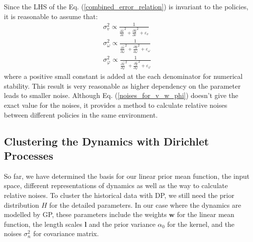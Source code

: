 \documentclass[journal]{IEEEtran}
\begin{document}
Since the LHS of the Eq. (\ref{combined_error_relation}) is invariant to the policies, it is reasonable to assume that:
\begin{equation}
\begin{gathered}
\sigma_v^2 \propto
\frac{1}{
\frac{\partial \hat{x}}{\partial v}^2 
+ \frac{\partial \hat{y}}{\partial v}^2 + \varepsilon_v}
\\
\sigma_{\omega}^2 \propto
\frac{1}{
\frac{\partial \hat{x}}{\partial \omega}^2
+
\frac{\partial \hat{y}}{\partial \omega}^2 + \varepsilon_{\omega}} 
\\
\sigma_{\varphi}^2 \propto
\frac{1}{
\frac{\partial \hat{x}}{\partial \varphi}^2
+ 
\frac{\partial \hat{y}}{\partial \varphi}^2 + \varepsilon_{\varphi}} 
\end{gathered}
\label{noises_for_v_w_phi}
\end{equation}
where a positive small constant is added at the each denominator for numerical stability.
This result is very reasonable as higher dependency on the parameter leads to smaller noise.
Although Eq. (\ref{noises_for_v_w_phi}) doesn't give the exact value for the noises, it provides a method to calculate relative noises between different policies in the same environment.



\subsection{Clustering the Dynamics with Dirichlet Processes}
So far, we have determined the basis for our linear prior mean function, the input space, different representations of dynamics as well as the way to calculate relative noises.
To cluster the historical data with DP, we still need the prior distribution $H$ for the detailed parameters. 
In our case where the dynamics are modelled by GP, these parameters include the weights $\bm{w}$ for the linear mean function, the length scales $\bm{l}$ and the prior variance $\alpha_0$ for the kernel, and the noises $\sigma_{n}^2$ for covariance matrix.
\end{document}
